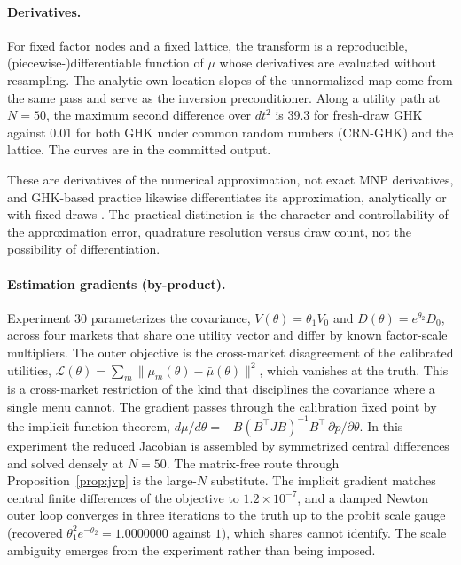 \documentclass[12pt]{article}
\theoremstyle{remark}
\begin{document}
\paragraph{Derivatives.} For fixed factor nodes and a fixed
lattice, the transform is a reproducible, (piecewise-)differentiable function
of $\mu$ whose derivatives are evaluated without resampling. The analytic own-location slopes of the unnormalized map come from the same pass and serve as the inversion preconditioner. Along a utility path at $N=50$, the maximum second difference over
$dt^2$ is 39.3 for fresh-draw GHK against 0.01 for both GHK under common
random numbers (CRN-GHK) and the lattice. The curves are in the
committed output.

These are derivatives of the numerical
approximation, not exact MNP derivatives, and GHK-based practice likewise
differentiates its approximation, analytically or with fixed draws
\citep{hmr1996,hajivassiliou1998,train2009}. The practical distinction is the character and controllability of the
approximation error, quadrature resolution versus draw count, not the
possibility of differentiation.

\paragraph{Estimation gradients (by-product).} Experiment 30
parameterizes the covariance, $V(\theta) = \theta_1 V_0$ and
$D(\theta) = e^{\theta_2} D_0$, across four markets that share one
utility vector and differ by known factor-scale multipliers. The outer
objective is the cross-market disagreement of the calibrated utilities,
$\mathcal{L}(\theta) = \sum_m \|\mu_m(\theta) - \bar\mu(\theta)\|^2$, which
vanishes at the truth. This is a cross-market restriction of the kind
that disciplines the covariance where a single menu cannot. The
gradient passes through the calibration fixed point by the implicit
function theorem, $d\mu/d\theta = -B(B^\top J B)^{-1}B^\top\,
\partial p/\partial\theta$. In this experiment the reduced Jacobian is
assembled by symmetrized central differences and solved densely at
$N = 50$. The matrix-free route through Proposition~\ref{prop:jvp} is
the large-$N$ substitute. The implicit gradient matches central finite
differences of the objective to $1.2\times10^{-7}$, and a damped Newton
outer loop converges in three iterations to the truth up to the probit
scale gauge (recovered $\theta_1^2 e^{-\theta_2} = 1.0000000$ against
$1$), which shares cannot identify. The scale ambiguity emerges from
the experiment rather than being imposed.
\end{document}
